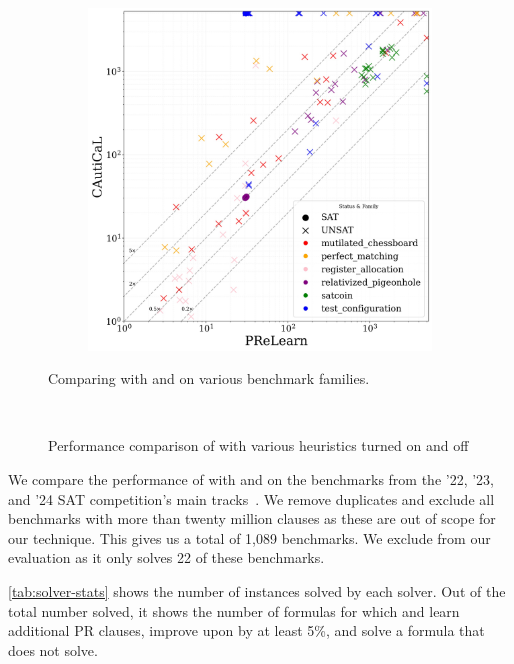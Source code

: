 \begin{figure}[!h]
\begin{subfigure}[t]{0.45\textwidth}
        \includegraphics[width=\textwidth]{figs/prelearn_vs_cautical_interesting_legend.jpg}
        \label{fig:cautical-vs-prelearn}
    \end{subfigure}

    \caption{Comparing \tool with \cadical and \prelearn on various benchmark families.}
    \label{fig:solver-comparison-familis}
\end{figure}

\begin{figure}[!t]
    \centering
    
    \caption{Performance comparison of \tool with various heuristics turned on and off}~\label{fig:global-heuristics}
\end{figure}

We compare the performance of \tool with \cadical and \prelearn on the
benchmarks from the '22, '23, and '24 SAT competition's main
tracks~\cite{satcomp2022,satcomp2023,satcomp2024}. We remove duplicates and
exclude all benchmarks with more than twenty million clauses as these are out of
scope for our technique. This gives us a total of 1,089 benchmarks. We exclude
\sadical from our evaluation as it only solves 22 of these benchmarks.

\autoref{tab:solver-stats} shows the number of instances solved by each solver.
Out of the total number solved, it shows the number of formulas for which
\prelearn and \tool learn additional PR clauses, improve upon \cadical by at
least 5\%, and solve a formula that \cadical does not solve. 

